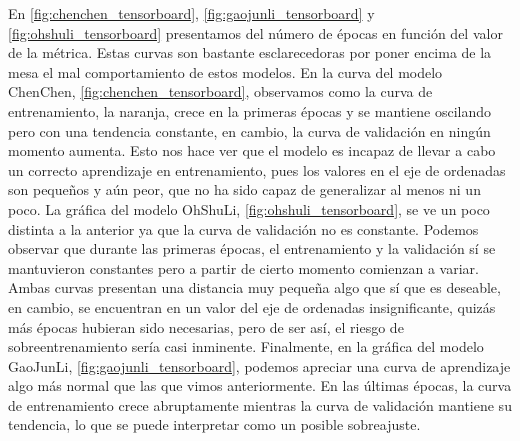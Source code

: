     En \ref{fig:chenchen_tensorboard}, \ref{fig:gaojunli_tensorboard} y \ref{fig:ohshuli_tensorboard} presentamos del número de épocas en función del valor de la métrica. Estas curvas son bastante esclarecedoras por poner encima de la mesa el mal comportamiento de estos modelos. En la curva del modelo ChenChen, \ref{fig:chenchen_tensorboard}, observamos como la curva de entrenamiento, la naranja, crece en la primeras épocas y se mantiene oscilando pero con una tendencia constante, en cambio, la curva de validación en ningún momento aumenta. Esto nos hace ver que el modelo es incapaz de llevar a cabo un correcto aprendizaje en entrenamiento, pues los valores en el eje de ordenadas son pequeños y aún peor, que no ha sido capaz de generalizar al menos ni un poco. La gráfica del modelo OhShuLi, \ref{fig:ohshuli_tensorboard}, se ve un poco distinta a la anterior ya que la curva de validación no es constante. Podemos observar que durante las primeras épocas, el entrenamiento y la validación sí se mantuvieron constantes pero a partir de cierto momento comienzan a variar. Ambas curvas presentan una distancia muy pequeña algo que sí que es deseable, en cambio, se encuentran en un valor del eje de ordenadas insignificante, quizás más épocas hubieran sido necesarias, pero de ser así, el riesgo de sobreentrenamiento sería casi inminente. Finalmente, en la gráfica del modelo GaoJunLi, \ref{fig:gaojunli_tensorboard}, podemos apreciar una curva de aprendizaje algo más normal que las que vimos anteriormente. En las últimas épocas, la curva de entrenamiento crece abruptamente mientras la curva de validación mantiene su tendencia, lo que se puede interpretar como un posible sobreajuste. \\
    
